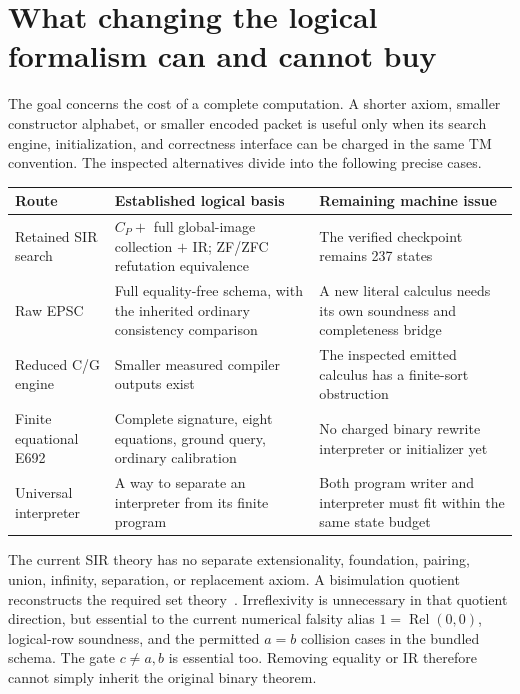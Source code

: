\section{What changing the logical formalism can and cannot buy}
\label{sec:routes}

The goal concerns the cost of a complete computation.  A shorter
axiom, smaller constructor alphabet, or smaller encoded packet
is useful only when its search engine, initialization, and
correctness interface can be charged in the same TM convention.
The inspected alternatives divide into the following precise
cases.

\begin{center}\small
\begin{tabularx}{\textwidth}{@{}p{}XX@{}}
\toprule
Route & Established logical basis & Remaining machine issue\\
\midrule
Retained SIR search & $C_P+$ full global-image collection $+$ IR;
ZF/ZFC refutation equivalence & The verified checkpoint remains 237 states\\
Raw EPSC & Full equality-free schema, with the inherited
ordinary consistency comparison & A new literal calculus needs
its own soundness and completeness bridge\\
Reduced C/G engine & Smaller measured compiler outputs exist &
The inspected emitted calculus has a finite-sort obstruction\\
Finite equational E692 & Complete signature, eight equations,
ground query, ordinary calibration & No charged binary rewrite
interpreter or initializer yet\\
Universal interpreter & A way to separate an interpreter from
its finite program & Both program writer and interpreter must
fit within the same state budget\\
\bottomrule
\end{tabularx}
\end{center}

The current SIR theory has no separate extensionality,
foundation, pairing, union, infinity, separation, or replacement
axiom.  A bisimulation quotient reconstructs the required set
theory~\cite{m254sets}.  Irreflexivity is unnecessary in that
quotient direction, but essential to the current numerical
falsity alias $1=\operatorname{Rel}(0,0)$, logical-row soundness,
and the permitted $a=b$ collision cases in the bundled schema.
The gate $c\ne a,b$ is essential too.  Removing equality or IR
therefore cannot simply inherit the original binary theorem.


